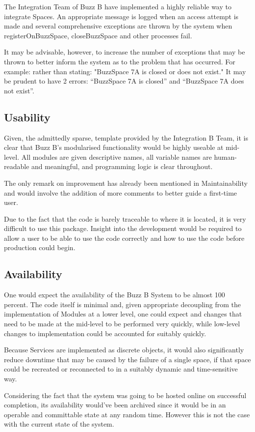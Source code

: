 \documentclass[12pt]{article}
\begin{document}
The Integration Team of Buzz B have implemented a highly reliable way to integrate Spaces. An appropriate message is logged when an access attempt is made and several comprehensive exceptions are thrown by the system when registerOnBuzzSpace, closeBuzzSpace and other processes fail.

It may be advisable, however, to increase the number of exceptions that may be thrown to better inform the system as to the problem that has occurred. For example: rather than stating: "BuzzSpace 7A is closed or does not exist." It may be prudent to have 2 errors: “BuzzSpace 7A is closed” and “BuzzSpace 7A does not exist”.

\subsection{Usability}
Given, the admittedly sparse, template provided by the Integration B Team, it is clear that Buzz B’s modularised functionality would be highly useable at mid-level. All modules are given descriptive names, all variable names are human-readable and meaningful, and programming logic is clear throughout. 

The only remark on improvement has already been mentioned in Maintainability and would involve the addition of more comments to better guide a first-time user.


Due to the fact that the code is barely traceable to where it is located, it is very difficult to use this package. Insight into the development would be required to allow a user to be able to use the code correctly and how to use the code before production could begin.
\subsection{Availability}
One would expect the availability of the Buzz B System to be almost 100 percent. The code itself is minimal and, given appropriate decoupling from the implementation of Modules at a lower level, one could expect and changes that need to be made at the mid-level to be performed very quickly, while low-level changes to implementation could be accounted for suitably quickly.

Because Services are implemented as discrete objects, it would also significantly reduce downtime that may be caused by the failure of a single space, if that space could be recreated or reconnected to in a suitably dynamic and time-sensitive way.

Considering the fact that the system was going to be hosted online on successful completion, its availability would've been archived since it would be in an operable and committable state at any random time. However this is not the case with the current state of the system.
\end{document}
